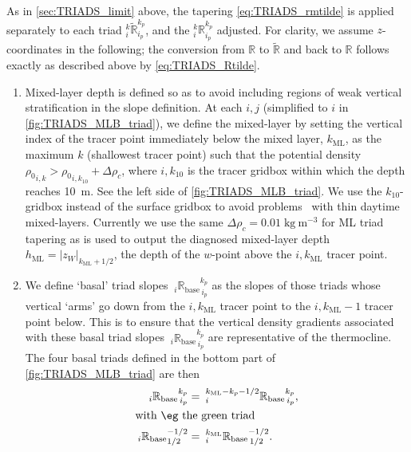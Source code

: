 \documentclass[../main/NEMO_manual]{subfiles}
\begin{document}
As in \autoref{sec:TRIADS_limit} above, the tapering \autoref{eq:TRIADS_rmtilde} is applied separately to
each triad $_i^k\tilde{\mathbb{R}}_{i_p}^{k_p}$, and the $_i^k\mathbb{R}_{i_p}^{k_p}$ adjusted.
For clarity, we assume $z$-coordinates in the following;
the conversion from $\mathbb{R}$ to $\tilde{\mathbb{R}}$ and back to $\mathbb{R}$ follows exactly as
described above by \autoref{eq:TRIADS_Rtilde}.
\begin{enumerate}
\item Mixed-layer depth is defined so as to avoid including regions of weak vertical stratification in
  the slope definition.
  At each $i,j$ (simplified to $i$ in \autoref{fig:TRIADS_MLB_triad}),
  we define the mixed-layer by setting the vertical index of the tracer point immediately below the mixed layer,
  $k_{\mathrm{ML}}$, as the maximum $k$ (shallowest tracer point) such that
  the potential density ${\rho_0}_{i,k}>{\rho_0}_{i,k_{10}}+\Delta\rho_c$,
  where $i,k_{10}$ is the tracer gridbox within which the depth reaches 10~m.
  See the left side of \autoref{fig:TRIADS_MLB_triad}.
  We use the $k_{10}$-gridbox instead of the surface gridbox to avoid problems \eg\ with thin daytime mixed-layers.
  Currently we use the same $\Delta\rho_c=0.01\;\mathrm{kg\:m^{-3}}$ for ML triad tapering as is used to
  output the diagnosed mixed-layer depth $h_{\mathrm{ML}}=|z_{W}|_{k_{\mathrm{ML}}+1/2}$,
  the depth of the $w$-point above the $i,k_{\mathrm{ML}}$ tracer point.
\item We define `basal' triad slopes ${\:}_i{\mathbb{R}_{\mathrm{base}}}_{\,i_p}^{k_p}$ as
  the slopes of those triads whose vertical `arms' go down from the $i,k_{\mathrm{ML}}$ tracer point to
  the $i,k_{\mathrm{ML}}-1$ tracer point below.
  This is to ensure that the vertical density gradients associated with
  these basal triad slopes ${\:}_i{\mathbb{R}_{\mathrm{base}}}_{\,i_p}^{k_p}$ are representative of the thermocline.
  The four basal triads defined in the bottom part of \autoref{fig:TRIADS_MLB_triad} are then
  \begin{align*}
    {\:}_i{\mathbb{R}_{\mathrm{base}}}_{\,i_p}^{k_p} &=
                                                       {\:}^{k_{\mathrm{ML}}-k_p-1/2}_i{\mathbb{R}_{\mathrm{base}}}_{\,i_p}^{k_p},
    \\
    \intertext{with \eg\ the green triad}
    {\:}_i{\mathbb{R}_{\mathrm{base}}}_{1/2}^{-1/2}&=
                                                     {\:}^{k_{\mathrm{ML}}}_i{\mathbb{R}_{\mathrm{base}}}_{\,1/2}^{-1/2}.

\end{align*}
\end{enumerate}
\end{document}
